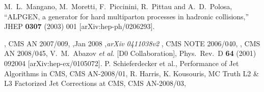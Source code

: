 \documentclass[colclass=cmspaper]{combine}
\begin{document}
\begin{linenumbers}
\begin{thebibliography}{9}

    M.~L.~Mangano, M.~Moretti, F.~Piccinini, R.~Pittau and A.~D.~Polosa,
    ``ALPGEN, a generator for hard multiparton processes in hadronic collisions,''
    JHEP {\bf 0307} (2003) 001
    [arXiv:hep-ph/0206293].

  , CMS AN 2007/009,
  ,Jan 2008 ,{\em arXiv 0411038v2}
  , CMS NOTE 2006/040,
  , CMS AN 2008/045,
    V.~M.~Abazov {\it et al.}  [D0 Collaboration], 	 
    Phys.\ Rev.\  D {\bf 64} (2001) 092004 	 
    [arXiv:hep-ex/0105072]. 	 
   {P. Schieferdecker et al., Performance of Jet Algorithms in CMS}, CMS AN-2008/01,
   {R. Harris, K. Kousouris, MC Truth L2 \& L3 Factorized Jet Corrections at CMS}, CMS AN-2008/03,
 
 
 \end{thebibliography}
 

\end{linenumbers}
\end{document}
